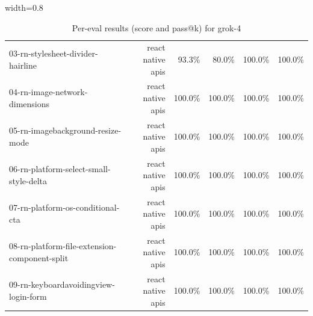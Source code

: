\begin{table}[htbp]
\begin{adjustbox}{width=0.8\textwidth}
\begin{tabular}{lrrrrr}
03-rn-stylesheet-divider-hairline & react native apis & 93.3\% & 80.0\% & 100.0\% & 100.0\% \\
04-rn-image-network-dimensions & react native apis & 100.0\% & 100.0\% & 100.0\% & 100.0\% \\
05-rn-imagebackground-resize-mode & react native apis & 100.0\% & 100.0\% & 100.0\% & 100.0\% \\
06-rn-platform-select-small-style-delta & react native apis & 100.0\% & 100.0\% & 100.0\% & 100.0\% \\
07-rn-platform-os-conditional-cta & react native apis & 100.0\% & 100.0\% & 100.0\% & 100.0\% \\
08-rn-platform-file-extension-component-split & react native apis & 100.0\% & 100.0\% & 100.0\% & 100.0\% \\
09-rn-keyboardavoidingview-login-form & react native apis & 100.0\% & 100.0\% & 100.0\% & 100.0\% \\
\bottomrule
\end{tabular}
\end{adjustbox}
\caption{Per-eval results (score and pass@k) for grok-4}
\end{table}
